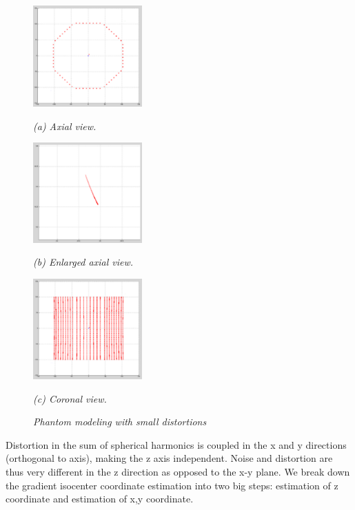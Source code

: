 \begin{figure}[htb]

  \begin{minipage}[b]{1.65in}
    \centering
    \centerline{\mbox{\includegraphics[width=1.65in]{isocenter/images/simulation/axial_distortion_1.eps}}}
    \centerline{\emph{(a) Axial view.}}
  \end{minipage}
  \hfill
  \begin{minipage}[b]{1.65in}
    \centering
    \centerline{\mbox{\includegraphics[width=1.65in]{isocenter/images/simulation/axial_tube_distortion_1.eps}}}
    \centerline{\emph{(b) Enlarged axial view.}}
  \end{minipage}
  \hfill
  \begin{minipage}[b]{1.65in}
    \centering
    \centerline{\mbox{\includegraphics[width=1.65in]{isocenter/images/simulation/coronal_distortion_1.eps}}}
    \centerline{\emph{(c) Coronal view.}}
  \end{minipage}
%
\caption{\emph{Phantom modeling with small distortions}} \label{fig:3}
%
\end{figure}



Distortion in the sum of spherical harmonics is coupled in the x and y directions (orthogonal to axis), making the z axis independent.  Noise and distortion are thus very different in the z direction as opposed to the x-y plane.  We break down the gradient isocenter coordinate estimation into two big steps: estimation of z coordinate and estimation of x,y coordinate.

